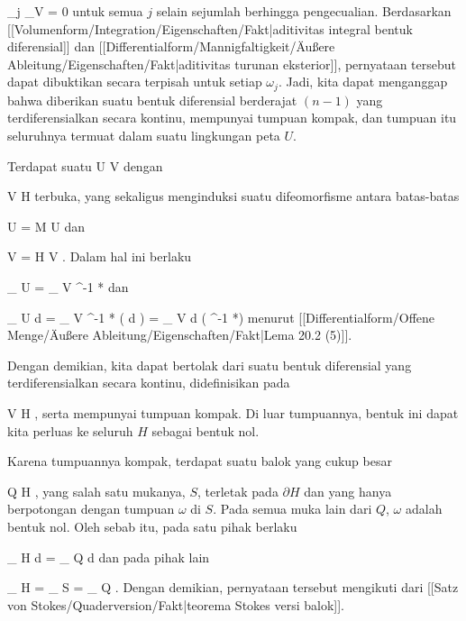 {{\mavergleichskettedisp
{\vergleichskette
{ \omega_j \vert_V
}
{ =} { 0
}
{ } {
}
{ } {
}
{ } {
}
}
{}{}{}
untuk semua $j$ selain sejumlah berhingga pengecualian. Berdasarkan
[[Volumenform/Integration/Eigenschaften/Fakt|aditivitas integral bentuk diferensial]]
dan
[[Differentialform/Mannigfaltigkeit/Äußere Ableitung/Eigenschaften/Fakt|aditivitas turunan eksterior]],
pernyataan tersebut dapat dibuktikan secara terpisah untuk setiap $\omega_j$. Jadi, kita dapat menganggap bahwa diberikan suatu bentuk diferensial berderajat $(n-1)$ yang terdiferensialkan secara kontinu, mempunyai tumpuan kompak, dan tumpuan itu seluruhnya termuat dalam suatu lingkungan peta $U$.}
{}
\teilbeweis {}{}{}
{Terdapat suatu
\maabb {\alpha} { U } { V
} {}
dengan

\mavergleichskette
{\vergleichskette
{ V
}
{ \subseteq }{ H
}
{  }{
}
{    }{
}
{   }{
}
}
{}{}{}
terbuka, yang sekaligus menginduksi suatu difeomorfisme antara batas-batas

\mavergleichskette
{\vergleichskette
{ \partial U
}
{ = }{ \partial M \cap U
}
{  }{
}
{    }{
}
{   }{
}
}
{}{}{}
dan

\mavergleichskette
{\vergleichskette
{ \partial V
}
{ = }{ \partial H \cap V
}
{  }{
}
{    }{
}
{   }{
}
}
{}{}{.}
Dalam hal ini berlaku

\mavergleichskettedisp
{\vergleichskette
{
\int_{  \partial U  }   \omega
}
{ =} {
\int_{  \partial V  }  \alpha^{-1 *}\omega
}
{ } {
}
{ } {
}
{ } {
}
}
{}{}{}
dan

\mavergleichskettedisp
{\vergleichskette
{
\int_{ U  }  d \omega
}
{ =} {
\int_{ V  }  \alpha^{-1 *} (  d \omega)
}
{ =} {
\int_{  V  }  d \left(  \alpha^{-1 *}\omega  \right)
}
{ } {
}
{ } {
}
}
{}{}{}
menurut
[[Differentialform/Offene Menge/Äußere Ableitung/Eigenschaften/Fakt|Lema 20.2 (5)]].}
{\leerzeichen{}Dengan demikian, kita dapat bertolak dari suatu bentuk diferensial yang terdiferensialkan secara kontinu, didefinisikan pada

\mavergleichskette
{\vergleichskette
{ V
}
{ \subseteq }{ H
}
{  }{
}
{    }{
}
{   }{
}
}
{}{}{,}
serta mempunyai tumpuan kompak. Di luar tumpuannya, bentuk ini dapat kita perluas ke seluruh $H$ sebagai bentuk nol.}
\teilbeweis {}{}{}
{Karena tumpuannya kompak, terdapat suatu balok yang cukup besar

\mavergleichskette
{\vergleichskette
{ Q
}
{ \subseteq }{ H
}
{  }{
}
{    }{
}
{   }{
}
}
{}{}{,}
yang salah satu mukanya, $S$, terletak pada $\partial H$ dan yang hanya berpotongan dengan tumpuan $\omega$ di $S$. Pada semua muka lain dari $Q$, $\omega$
 {} {}
adalah bentuk nol. Oleh sebab itu, pada satu pihak berlaku

\mavergleichskettedisp
{\vergleichskette
{
\int_{ H  }  d\omega
}
{ =} {
\int_{ Q  }  d\omega
}
{ } {
}
{ } {
}
{ } {
}
}
{}{}{}
dan pada pihak lain

\mavergleichskettedisp
{\vergleichskette
{
\int_{  \partial H  }   \omega
}
{ =} {
\int_{  S  }   \omega
}
{ =} {
\int_{  \partial Q  }   \omega
}
{ } {
}
{ } {
}
}
{}{}{.}
Dengan demikian, pernyataan tersebut mengikuti dari
[[Satz von Stokes/Quaderversion/Fakt|teorema Stokes versi balok]].}
{}

}

